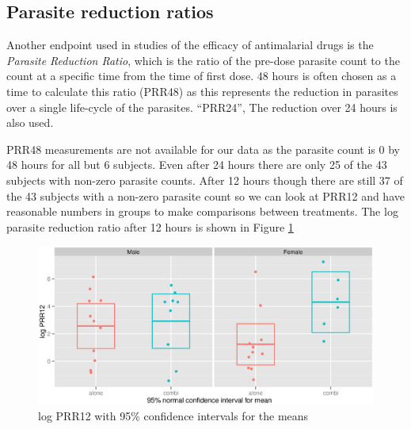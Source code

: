 \subsection{Parasite reduction ratios}
Another endpoint used in studies of the efficacy of antimalarial drugs is the \emph{Parasite Reduction Ratio}, which is the ratio of the pre-dose parasite count to the count at a specific time from the time of first dose. 48 hours is often chosen as a time to calculate this ratio (PRR48) as this represents the reduction in parasites over a single life-cycle of the parasites\cite{white}. ``PRR24'', The reduction over 24 hours is also used\cite{newton}.

PRR48 measurements are not available for our data as the parasite count is 0 by 48 hours for all but 6 subjects. Even after 24 hours there are only 25 of the 43 subjects with non-zero parasite counts. After 12 hours though there are still 37 of the 43 subjects with a non-zero parasite count so we can look at PRR12 and have reasonable numbers in groups to make comparisons between treatments. The log parasite reduction ratio after 12 hours is shown in Figure \ref{prr12}
\begin{figure}
\includegraphics[width=150mm]{prr12.eps} 
\caption{log PRR12 with 95\% confidence intervals for the means}
\label{prr12}
\end{figure}

